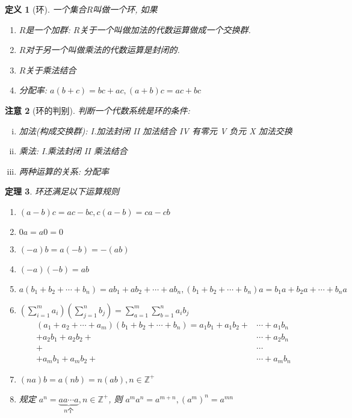 \documentclass[UTF8]{ctexart}
\newtheorem{Definition}{定义}%
\newtheorem{Theorem}[Definition]{定理}
\newtheorem{Remark}[Definition]{注意}
\begin{document}
\begin{Definition}[环]
一个集合$R$叫做一个环, 如果
\begin{enumerate}
	\item $R$是一个加群: $R$关于一个叫做加法的代数运算做成一个交换群.
	\item $R$对于另一个叫做乘法的代数运算是封闭的.
	\item $R$关于乘法结合
	\item 分配率: $a(b+c) = bc + ac, (a+b)c = ac + bc$
\end{enumerate}
\end{Definition}

\begin{Remark}[环的判别] 判断一个代数系统是环的条件: 
\begin{enumerate}[(i)]
\item 加法(构成交换群): I.加法封闭 II 加法结合 IV 有零元 V 负元 X 加法交换
\item 乘法: I.乘法封闭 II 乘法结合
\item 两种运算的关系: 分配率
\end{enumerate}
\end{Remark}

\begin{Theorem}
环还满足以下运算规则
\begin{enumerate}[(1)]
\item[(7)] $(a-b)c = ac - bc, c(a - b) = ca - cb$
\item[(8)] $0a = a0 = 0$
\item[(9)] $(-a)b = a(-b) = -(ab)$
\item[(10)] $(-a)(-b) = ab$
\item[(11)] $a(b_1 + b_2 + \cdots + b_n) = ab_1 +ab_2 + \cdots + ab_n, (b_1 + b_2 + \cdots + b_n)a = b_1a + b_2a + \cdots + b_na$
\item[(12)] 
$ \displaystyle \left( \sum_{i=1}^m a_i \right) \left( \sum_{j=1}^n b_j \right) 
= \sum_{a=1}^m \sum_{b=1}^{n} a_i b_j $
           $$
\begin{aligned}
(a_1 + a_2 + \cdots + a_m) (b_1 + b_2 + \cdots + b_n) 
= 
a_1b_1 + a_1 b_2 + &\cdots + a_1 b_n \\
+ a_2 b_1 + a_2 b_2 + &\cdots + a_2 b_n \\
+ &\cdots \\
+ a_m b_1 + a_m b_2 + &\cdots + a_m b_n
\end{aligned}
 $$
 \item[(13)] $ (na)b = a(nb) = n(ab), n \in \mathbb{Z}^+$ 
 \item[(14)] 规定 $a^n = \underbrace{a a \cdots a}_{n\text{个}}, n \in \mathbb{Z}^{+}$, 则 $ a^m a^n = a^{m+n}, (a^m)^n = a^{mn} $
\end{enumerate}
\end{Theorem}
\end{document}
